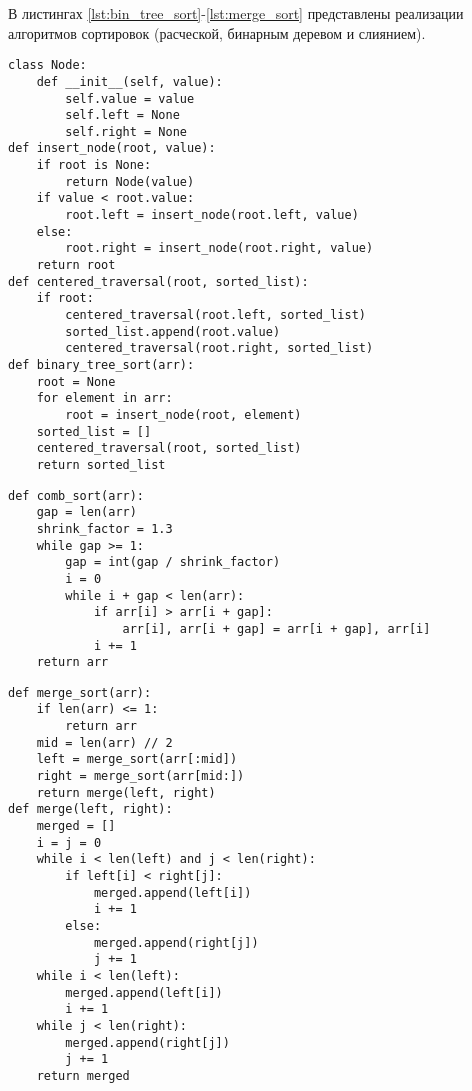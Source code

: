 В листингах \ref{lst:bin_tree_sort}-\ref{lst:merge_sort} представлены реализации алгоритмов сортировок (расческой, бинарным деревом и слиянием).

\begin{center}
\captionsetup{justification=raggedright,singlelinecheck=off}
	\begin{lstlisting}[label=lst:bin_tree_sort,caption=Алгоритм сортировки бинарным деревом]
class Node:
	def __init__(self, value):
		self.value = value
		self.left = None
		self.right = None
def insert_node(root, value):
	if root is None:
		return Node(value)
	if value < root.value:
		root.left = insert_node(root.left, value)
	else:
		root.right = insert_node(root.right, value)
	return root
def centered_traversal(root, sorted_list):
	if root:
		centered_traversal(root.left, sorted_list)
		sorted_list.append(root.value)
		centered_traversal(root.right, sorted_list)
def binary_tree_sort(arr):
	root = None
	for element in arr:
		root = insert_node(root, element)
	sorted_list = []
	centered_traversal(root, sorted_list)
	return sorted_list
	\end{lstlisting}
\end{center}
\clearpage
\begin{center}
	\captionsetup{justification=raggedright,singlelinecheck=off}
	\begin{lstlisting}[label=lst:comb_sort,caption=Алгоритм сортировки расческой]
def comb_sort(arr):
	gap = len(arr)
	shrink_factor = 1.3
	while gap >= 1:
		gap = int(gap / shrink_factor)
		i = 0
		while i + gap < len(arr):
			if arr[i] > arr[i + gap]:
				arr[i], arr[i + gap] = arr[i + gap], arr[i]
			i += 1
	return arr
	\end{lstlisting}
\end{center}

\begin{center}
\captionsetup{justification=raggedright,singlelinecheck=off}
	\begin{lstlisting}[label=lst:merge_sort,caption=Алгоритм сортировки слиянием]
def merge_sort(arr):
	if len(arr) <= 1:
		return arr
	mid = len(arr) // 2
	left = merge_sort(arr[:mid])
	right = merge_sort(arr[mid:])
	return merge(left, right)
def merge(left, right):
	merged = []
	i = j = 0
	while i < len(left) and j < len(right):
		if left[i] < right[j]:
			merged.append(left[i])
			i += 1
		else:
			merged.append(right[j])
			j += 1
	while i < len(left):
		merged.append(left[i])
		i += 1
	while j < len(right):
		merged.append(right[j])
		j += 1
	return merged
	\end{lstlisting}
\end{center}

